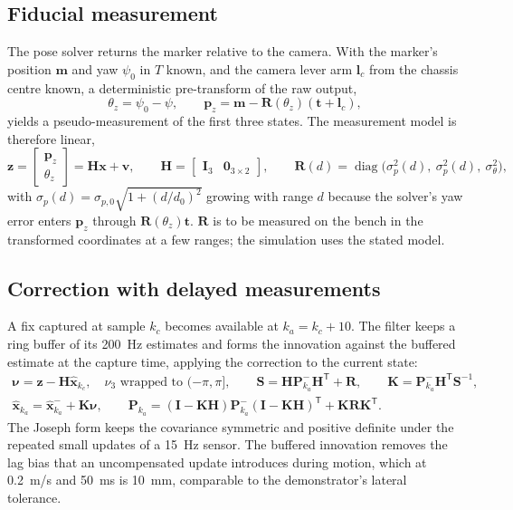 \documentclass[11pt,a4paper]{article}
\newcommand{\vect}[1]{\bm{#1}}
\newcommand{\mat}[1]{\bm{#1}}
\newcommand{\T}{^{\mathsf{T}}}
\newcommand{\diag}{\operatorname{diag}}
\newcommand{\Rot}{\mat{R}}
\newcommand{\hx}{\hat{\vect x}}
\begin{document}
\subsection{Fiducial measurement}
The pose solver returns the marker relative to the camera. With the marker's position $\vect m$ and yaw $\psi_0$ in $T$ known, and the camera lever arm $\vect l_c$ from the chassis centre known, a deterministic pre-transform of the raw output,
\begin{equation}
\theta_z = \psi_0 - \psi,\qquad \vect p_z = \vect m - \Rot(\theta_z)(\vect t + \vect l_c),
\label{eq:fid-chain}
\end{equation}
yields a pseudo-measurement of the first three states. The measurement model is therefore linear,
\begin{equation}
\vect z = \begin{bmatrix}\vect p_z\\ \theta_z\end{bmatrix} = \mat H\vect x + \vect v,\qquad
\mat H = \begin{bmatrix}\mat I_3 & \mat 0_{3\times 2}\end{bmatrix},\qquad
\mat R(d) = \diag\big(\sigma_p^2(d),\ \sigma_p^2(d),\ \sigma_\theta^2\big),
\label{eq:fid-model}
\end{equation}
with $\sigma_p(d) = \sigma_{p,0}\sqrt{1 + (d/d_0)^2}$ growing with range $d$ because the solver's yaw error enters $\vect p_z$ through $\Rot(\theta_z)\vect t$. $\mat R$ is to be measured on the bench in the transformed coordinates at a few ranges; the simulation uses the stated model.

\subsection{Correction with delayed measurements}
A fix captured at sample $k_c$ becomes available at $k_a = k_c + 10$. The filter keeps a ring buffer of its 200~Hz estimates and forms the innovation against the buffered estimate at the capture time, applying the correction to the current state:
\begin{gather}
\vect\nu = \vect z - \mat H\hx_{k_c},\quad \nu_3 \text{ wrapped to } (-\pi,\pi],\qquad
\mat S = \mat H\mat P_{k_a}^-\mat H\T + \mat R,\qquad
\mat K = \mat P_{k_a}^-\mat H\T\mat S^{-1},\\
\hx_{k_a} = \hx_{k_a}^- + \mat K\vect\nu,\qquad
\mat P_{k_a} = (\mat I - \mat K\mat H)\mat P_{k_a}^-(\mat I - \mat K\mat H)\T + \mat K\mat R\mat K\T .
\label{eq:ekf-upd}
\end{gather}
The Joseph form keeps the covariance symmetric and positive definite under the repeated small updates of a 15~Hz sensor. The buffered innovation removes the lag bias that an uncompensated update introduces during motion, which at 0.2~m/s and 50~ms is 10~mm, comparable to the demonstrator's lateral tolerance.
\end{document}
